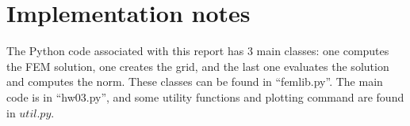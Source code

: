 \documentclass[10pt]{article}
\begin{document}
\section{Implementation notes}
The Python code associated with this report has 3 main classes: one computes the FEM solution, one creates the grid, and the last
one evaluates the solution and computes the norm. These classes can be found in ``femlib.py''. The main code is in ``hw03.py'',
and some utility functions and plotting command are found in $util.py$.
\end{document}
